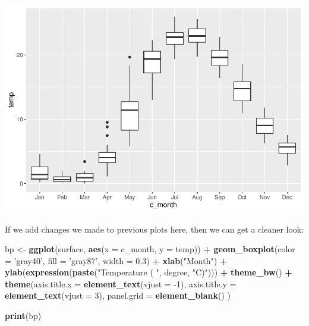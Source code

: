 \documentclass[
]{book}
\newenvironment{Shaded}{\begin{snugshade}}{\end{snugshade}}
\newcommand{\DataTypeTok}[1]{\textcolor[rgb]{0.13,0.29,0.53}{#1}}
\newcommand{\DecValTok}[1]{\textcolor[rgb]{0.00,0.00,0.81}{#1}}
\newcommand{\FloatTok}[1]{\textcolor[rgb]{0.00,0.00,0.81}{#1}}
\newcommand{\KeywordTok}[1]{\textcolor[rgb]{0.13,0.29,0.53}{\textbf{#1}}}
\newcommand{\NormalTok}[1]{#1}
\newcommand{\OperatorTok}[1]{\textcolor[rgb]{0.81,0.36,0.00}{\textbf{#1}}}
\newcommand{\StringTok}[1]{\textcolor[rgb]{0.31,0.60,0.02}{#1}}
\begin{document}
\includegraphics{worstr_files/figure-latex/unnamed-chunk-112-1.pdf}

If we add changes we made to previous plots here, then we can get a cleaner look:

\begin{Shaded}
\begin{Highlighting}[]
\NormalTok{bp <-}\StringTok{ }\KeywordTok{ggplot}\NormalTok{(surface, }\KeywordTok{aes}\NormalTok{(}\DataTypeTok{x =}\NormalTok{ c_month, }\DataTypeTok{y =}\NormalTok{ temp)) }\OperatorTok{+}
\StringTok{  }\KeywordTok{geom_boxplot}\NormalTok{(}\DataTypeTok{color =} \StringTok{'gray40'}\NormalTok{, }\DataTypeTok{fill =} \StringTok{'gray87'}\NormalTok{, }\DataTypeTok{width =} \FloatTok{0.3}\NormalTok{) }\OperatorTok{+}
\StringTok{  }\KeywordTok{xlab}\NormalTok{(}\StringTok{"Month"}\NormalTok{) }\OperatorTok{+}
\StringTok{  }\KeywordTok{ylab}\NormalTok{(}\KeywordTok{expression}\NormalTok{(}\KeywordTok{paste}\NormalTok{(}\StringTok{"Temperature ( "}\NormalTok{, degree, }\StringTok{"C)"}\NormalTok{))) }\OperatorTok{+}
\StringTok{  }\KeywordTok{theme_bw}\NormalTok{() }\OperatorTok{+}
\StringTok{  }\KeywordTok{theme}\NormalTok{(}\DataTypeTok{axis.title.x =} \KeywordTok{element_text}\NormalTok{(}\DataTypeTok{vjust =} \DecValTok{-1}\NormalTok{),}
        \DataTypeTok{axis.title.y =} \KeywordTok{element_text}\NormalTok{(}\DataTypeTok{vjust =} \DecValTok{3}\NormalTok{),}
        \DataTypeTok{panel.grid =} \KeywordTok{element_blank}\NormalTok{()}
\NormalTok{  )}

\KeywordTok{print}\NormalTok{(bp)}
\end{Highlighting}
\end{Shaded}
\end{document}
